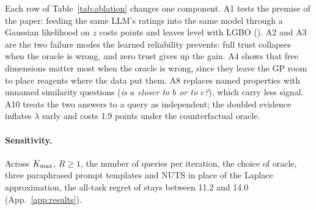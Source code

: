 Each row of Table~\ref{tab:ablation} changes one component. A1 tests the premise of the paper: feeding the same LLM's ratings into the same model through a Gaussian likelihood on $z$ costs \AblRatings{} points and leaves \ours{} level with LGBO (\AllLGBO{}). A2 and A3 are the two failure modes the learned reliability prevents: full trust collapses when the oracle is wrong, and zero trust gives up the gain. A4 shows that free dimensions matter most when the oracle is wrong, since they leave the GP room to place reagents where the data put them. A8 replaces named properties with unnamed similarity questions (\emph{is $a$ closer to $b$ or to $c$?}), which carry less signal. A10 treats the two answers to a query as independent; the doubled evidence inflates $\lambda$ early and costs 1.9 points under the counterfactual oracle.

\paragraph{Sensitivity.}
Across $K_{\max}$, $R\ge1$, the number of queries per iteration, the choice of oracle, three paraphrased prompt templates and NUTS in place of the Laplace approximation, the all-task regret of \ours{} stays between 11.2 and 14.0 (App.~\ref{app:results}).
